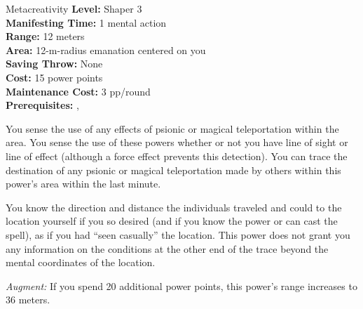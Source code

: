 {Metacreativity}
{
	\textbf{Level:}
	Shaper 3\\
	\textbf{Manifesting Time:}
	1 mental action\\
	\textbf{Range:}
	12 meters\\
	\textbf{Area:}
	12-m-radius emanation centered on you\\
	\textbf{Saving Throw:}
	None\\
	\textbf{Cost:}
	15 power points\\
	\textbf{Maintenance Cost:}
	3 pp/round\\
	\textbf{Prerequisites:}
	, \\
}
{
	You sense the use of any effects of psionic or magical teleportation within the area. You sense the use of these powers whether or not you have line of sight or line of effect (although a force effect prevents this detection). You can trace the destination of any psionic or magical teleportation made by others within this power's area within the last minute.

	You know the direction and distance the individuals traveled and could  to the location yourself if you so desired (and if you know the  power or can cast the  spell), as if you had ``seen casually'' the location. This power does not grant you any information on the conditions at the other end of the trace beyond the mental coordinates of the location.

	\textit{Augment:} If you spend 20 additional power points, this power's range increases to 36 meters. 
}
